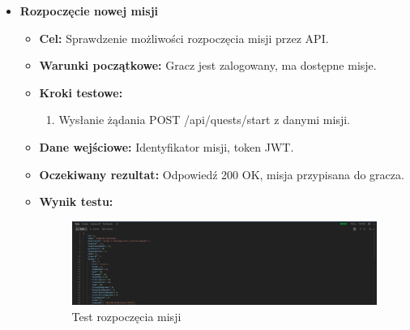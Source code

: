 \begin{itemize}
    \item \textbf{Rozpoczęcie nowej misji}
    \begin{itemize}
        \item \textbf{Cel:} Sprawdzenie możliwości rozpoczęcia misji przez API.
        \item \textbf{Warunki początkowe:} Gracz jest zalogowany, ma dostępne misje.
        \item \textbf{Kroki testowe:}
        \begin{enumerate}
            \item Wysłanie żądania POST /api/quests/start z danymi misji.
        \end{enumerate}
        \item \textbf{Dane wejściowe:} Identyfikator misji, token JWT.
        \item \textbf{Oczekiwany rezultat:} Odpowiedź 200 OK, misja przypisana do gracza.
        \item \textbf{Wynik testu:}
        \begin{figure}[H]
            \includegraphics[width=480px]{figures/testy/test-startquest.png}
            \caption{Test rozpoczęcia misji}
        \end{figure}
    \end{itemize}


\end{itemize}
